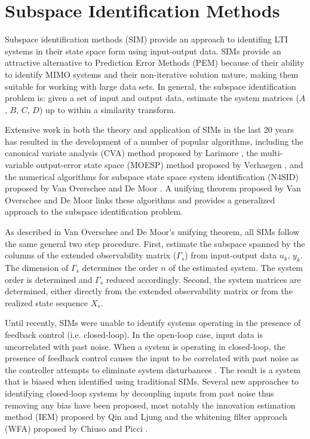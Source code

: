 \chapter{Subspace Identification Methods}
Subspace identification methods (SIM) provide an approach to identifing LTI systems in their state space form using input-output data. SIMs provide an attractive alternative to Prediction Error Methods (PEM) because of their ability to identify MIMO systems and their non-iterative solution nature, making them suitable for working with large data sets. In general, the subspace identification problem is: given a set of input and output data, estimate the system matrices ($A$, $B$, $C$, $D$) up to within a similarity transform. 

Extensive work in both the theory and application of SIMs in the last 20 years has resulted in the development of a number of popular algorithms, including the canonical variate analysis (CVA) method proposed by Larimore \cite{larimore1990canonical}, the multi-variable output-error state space (MOESP) method proposed by Verhaegen \cite{verhaegen1992subspace}, and the numerical algorithms for subspace state space system identification (N4SID) proposed by Van Overschee and De Moor \cite{van1994n4sid}. A unifying theorem proposed by Van Overschee and De Moor \cite{van1995unifying} links these algorithms and provides a generalized approach to the subspace identification problem.  

As described in Van Overschee and De Moor's unifying theorem, all SIMs follow the same general two step procedure. First, estimate the subspace spanned by the columns of the extended observability matrix ($\Gamma_s$) from input-output data $u_k$, $y_k$. The dimension of $\Gamma_s$ determines the order $n$ of the estimated system. The system order is determined and $\Gamma_s$ reduced accordingly. Second, the system matrices are determined, either directly from the extended observability matrix or from the realized state sequence $X_s$.

Until recently, SIMs were unable to identify systems operating in the presence of feedback control (i.e. closed-loop). In the open-loop case, input data is uncorrelated with past noise. When a system is operating in closed-loop, the presence of feedback control causes the input to be correlated with past noise as the controller attempts to eliminate system disturbances \cite{qin2006overview}. The result is a system that is biased when identified using traditional SIMs. Several new approaches to identifying closed-loop systems by decoupling inputs from past noise thus removing any bias have been proposed, most notably the innovation estimation method (IEM) proposed by Qin and Ljung \cite{qin2003closed} and the whitening filter approach (WFA) proposed by Chiuso and Picci \cite{chiuso2005consistency}.


